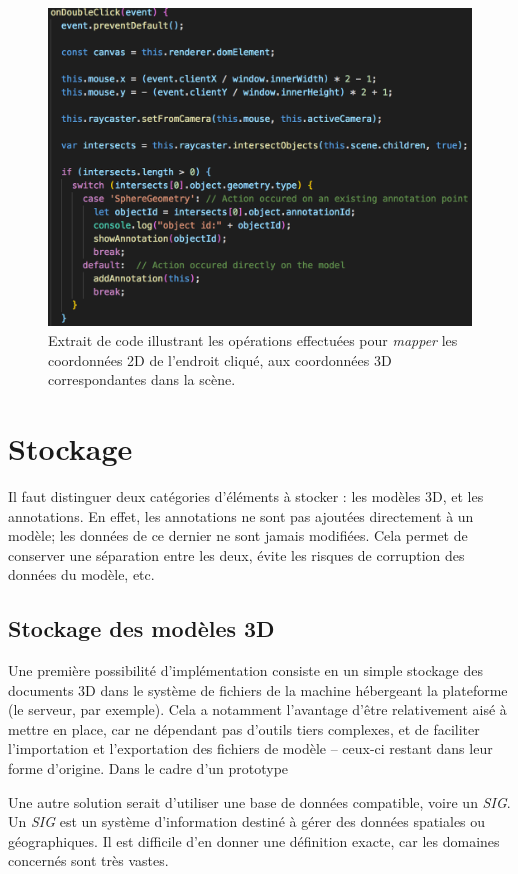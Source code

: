 \begin{figure}
    \centering
    \includegraphics[width=0.8\linewidth]{Figures/mip-viewer-raycasting-code.png}
    \caption{Extrait de code illustrant les opérations effectuées pour \textit{mapper} les coordonnées 2D de l'endroit cliqué, aux coordonnées 3D correspondantes dans la scène.}
    \label{fig:mip-viewer-raycasting-code}
\end{figure}

\section{Stockage}

Il faut distinguer deux catégories d'éléments à stocker : les modèles 3D, et les annotations.
En effet, les annotations ne sont pas ajoutées directement à un modèle; les données de ce dernier ne sont jamais modifiées. Cela permet de conserver une séparation entre les deux, évite les risques de corruption des données du modèle, etc.

\subsection{Stockage des modèles 3D}

Une première possibilité d'implémentation consiste en un simple stockage des documents 3D dans le système de fichiers de la machine hébergeant la plateforme (le serveur, par exemple). Cela a notamment l'avantage d'être relativement aisé à mettre en place, car ne dépendant pas d'outils tiers complexes, et de faciliter l'importation et l'exportation des fichiers de modèle -- ceux-ci restant dans leur forme d'origine.
Dans le cadre d'un prototype

Une autre solution serait d'utiliser une base de données compatible, voire un \textit{SIG}. 
Un \textit{SIG} est un système d'information destiné à gérer des données spatiales ou géographiques. Il est difficile d'en donner une définition exacte, car les domaines concernés sont très vastes.

